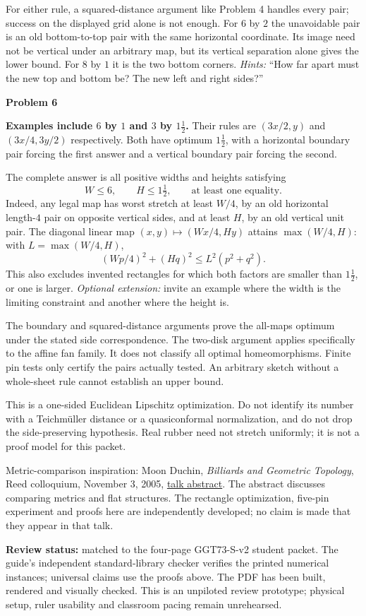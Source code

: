\documentclass[11pt,letterpaper]{article}
\newcommand{\sect}[1]{\par\vspace{5pt}{\large\bfseries #1}\par}
\newcommand{\prob}[1]{\par\vspace{3pt}\textbf{Problem #1}\par}
\begin{document}
For either rule, a squared-distance argument like Problem 4 handles every pair;
success on the displayed grid alone is not enough. For $6$ by $2$ the
unavoidable pair is an old bottom-to-top pair with the same horizontal
coordinate. Its image need not be vertical under an arbitrary map, but its
vertical separation alone gives the lower bound. For $8$ by $1$ it is the two
bottom corners. \textit{Hints:} ``How far apart must the new top and bottom be?
The new left and right sides?''

\prob{6}
\textbf{Examples include $6$ by $1$ and $3$ by $1\frac12$.}
Their rules are $(3x/2,y)$ and $(3x/4,3y/2)$ respectively. Both have optimum
$1\frac12$, with a horizontal boundary pair forcing the first answer and a
vertical boundary pair forcing the second.

The complete answer is all positive widths and heights satisfying
\[
 W\le6,\qquad H\le1\tfrac12,\qquad
 \text{at least one equality.}
\]
Indeed, any legal map has worst stretch at least $W/4$, by an old horizontal
length-$4$ pair on opposite vertical sides, and at least $H$, by an old vertical
unit pair. The diagonal linear map $(x,y)\mapsto(Wx/4,Hy)$ attains
$\max(W/4,H)$: with $L=\max(W/4,H)$,
\[
 (Wp/4)^2+(Hq)^2\le L^2(p^2+q^2).
\]
This also excludes invented rectangles for which both factors are smaller than
$1\frac12$, or one is larger. \textit{Optional extension:} invite an example
where the width is the limiting constraint and another where the height is.

\sect{What is proved and what is still unknown}
The boundary and squared-distance arguments prove the all-maps optimum under
the stated side correspondence. The two-disk argument applies specifically to
the affine fan family. It does not classify all optimal homeomorphisms.
Finite pin tests only certify the pairs actually tested. An arbitrary sketch
without a whole-sheet rule cannot establish an upper bound.

This is a one-sided Euclidean Lipschitz optimization. Do not identify its number
with a Teichm\"uller distance or a quasiconformal normalization, and do not drop
the side-preserving hypothesis. Real rubber need not stretch uniformly; it is
not a proof model for this packet.

\sect{Source lineage and status}
Metric-comparison inspiration: Moon Duchin, \emph{Billiards and Geometric
Topology}, Reed colloquium, November 3, 2005,
\href{https://people.reed.edu/~davidp/talks/talks05-06/talks/duchin.html}{talk abstract}.
The abstract discusses comparing metrics and flat structures. The rectangle
optimization, five-pin experiment and proofs here are independently developed;
no claim is made that they appear in that talk.

\textbf{Review status:} matched to the four-page GGT73-S-v2 student packet.
The guide's independent standard-library checker verifies the printed numerical
instances; universal claims use the proofs above. The PDF has been built,
rendered and visually checked. This is an unpiloted review prototype;
physical setup, ruler usability and classroom pacing remain unrehearsed.
\end{document}
